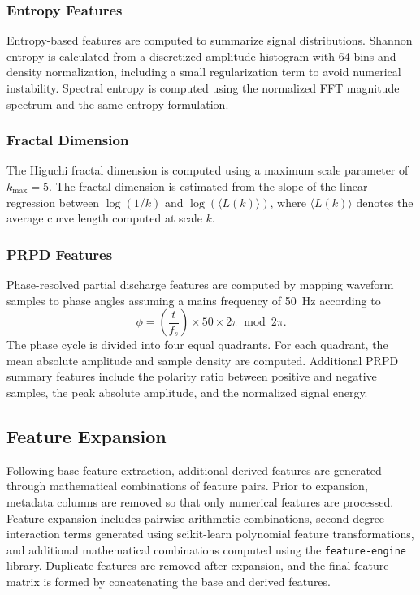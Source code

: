 \subsubsection{Entropy Features}

Entropy-based features are computed to summarize signal distributions. Shannon entropy is calculated from a discretized amplitude histogram with 64 bins and density normalization, including a small regularization term to avoid numerical instability. Spectral entropy is computed using the normalized FFT magnitude spectrum and the same entropy formulation.

\subsubsection{Fractal Dimension}

The Higuchi fractal dimension is computed using a maximum scale parameter of $k_{\max}=5$. The fractal dimension is estimated from the slope of the linear regression between $\log(1/k)$ and $\log(\langle L(k)\rangle)$, where $\langle L(k)\rangle$ denotes the average curve length computed at scale $k$.

\subsubsection{\ac{PRPD} Features}

Phase-resolved partial discharge features are computed by mapping waveform samples to phase angles assuming a mains frequency of 50~Hz according to
\[
\phi = \left(\frac{t}{f_s}\right)\times 50 \times 2\pi \bmod 2\pi.
\]
The phase cycle is divided into four equal quadrants. For each quadrant, the mean absolute amplitude and sample density are computed. Additional \ac{PRPD} summary features include the polarity ratio between positive and negative samples, the peak absolute amplitude, and the normalized signal energy.

\subsection{Feature Expansion}

Following base feature extraction, additional derived features are generated through mathematical combinations of feature pairs. Prior to expansion, metadata columns are removed so that only numerical features are processed. Feature expansion includes pairwise arithmetic combinations, second-degree interaction terms generated using scikit-learn polynomial feature transformations, and additional mathematical combinations computed using the \texttt{feature-engine} library. Duplicate features are removed after expansion, and the final feature matrix is formed by concatenating the base and derived features.


